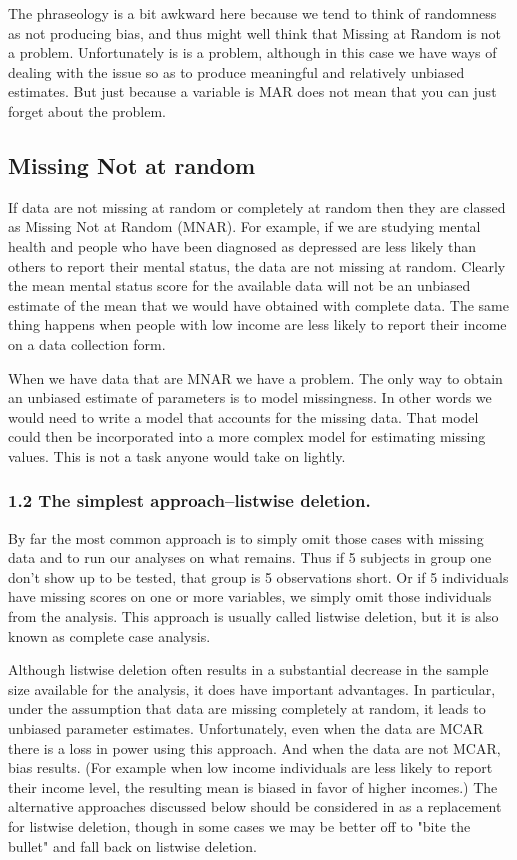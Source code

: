 The phraseology is a bit awkward here because we tend to think of randomness as not producing bias, and thus might well think that Missing at Random is not a problem. Unfortunately is is a problem, although in this case we have ways of dealing with the issue so as to produce meaningful and relatively unbiased estimates. But just because a variable is MAR does not mean that you can just forget about the problem.

\subsection{Missing Not at random}

If data are not missing at random or completely at random then they are classed as Missing Not at Random (MNAR). For example, if we are studying mental health and people who have been diagnosed as depressed are less likely than others to report their mental status, the data are not missing at random. Clearly the mean mental status score for the available data will not be an unbiased estimate of the mean that we would have obtained with complete data. The same thing happens when people with low income are less likely to report 
their income on a data collection form.

When we have data that are MNAR we have a problem. The only way to obtain an unbiased estimate of parameters is to model missingness. 
In other words we would need to write a model that accounts for the missing data. 
That model could then be incorporated into a more complex model for estimating 
missing values. This is not a task anyone would take on lightly. 




\subsubsection{1.2 The simplest approach--listwise deletion.}

By far the most common approach is to simply omit those cases with missing data and to run our analyses on what remains. Thus if 5 subjects in group one don't show up to be tested, that group is 5 observations short.  Or if 5 individuals have missing scores on one or more variables, we simply omit those individuals from the analysis. This approach is usually called listwise deletion, but it is also known as complete case analysis. 

Although listwise deletion often results in a substantial decrease in the sample size available for the analysis, it does have important advantages. In particular, under the assumption that data are missing completely at random, it leads to unbiased parameter estimates. Unfortunately, even when the data are MCAR there is a loss in power using this approach. And when the data are not MCAR, bias results. (For example when low income individuals are less likely to report their income level, the resulting mean is biased in favor of higher incomes.) The alternative approaches discussed below should be considered in as a replacement for listwise deletion, though in some cases we may be better off to "bite the bullet" and fall back on listwise deletion.

